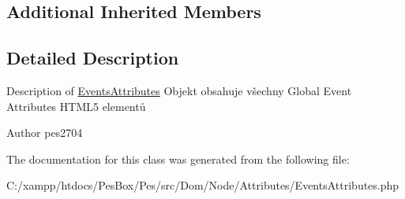 \subsection*{Additional Inherited Members}


\subsection{Detailed Description}
Description of \mbox{\hyperlink{class_pes_1_1_dom_1_1_node_1_1_attributes_1_1_events_attributes}{Events\+Attributes}} Objekt obsahuje všechny Global Event Attributes H\+T\+M\+L5 elementů

\begin{DoxyAuthor}{Author}
pes2704 
\end{DoxyAuthor}


The documentation for this class was generated from the following file\+:\begin{DoxyCompactItemize}
\item 
C\+:/xampp/htdocs/\+Pes\+Box/\+Pes/src/\+Dom/\+Node/\+Attributes/Events\+Attributes.\+php\end{DoxyCompactItemize}
